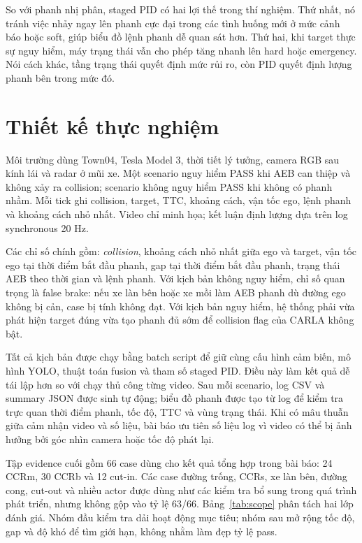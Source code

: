 \documentclass[conference]{IEEEtran}
\begin{document}
So với phanh nhị phân, staged PID có hai lợi thế trong thí nghiệm. Thứ nhất, nó tránh việc nhảy ngay lên phanh cực đại trong các tình huống mới ở mức cảnh báo hoặc soft, giúp biểu đồ lệnh phanh dễ quan sát hơn. Thứ hai, khi target thực sự nguy hiểm, máy trạng thái vẫn cho phép tăng nhanh lên hard hoặc emergency. Nói cách khác, tầng trạng thái quyết định mức rủi ro, còn PID quyết định lượng phanh bên trong mức đó.

\section{Thiết kế thực nghiệm}
Môi trường dùng Town04, Tesla Model 3, thời tiết lý tưởng, camera RGB sau kính lái và radar ở mũi xe. Một scenario nguy hiểm PASS khi AEB can thiệp và không xảy ra collision; scenario không nguy hiểm PASS khi không có phanh nhầm. Mỗi tick ghi collision, target, TTC, khoảng cách, vận tốc ego, lệnh phanh và khoảng cách nhỏ nhất. Video chỉ minh họa; kết luận định lượng dựa trên log synchronous 20 Hz.

Các chỉ số chính gồm: \textit{collision}, khoảng cách nhỏ nhất giữa ego và target, vận tốc ego tại thời điểm bắt đầu phanh, gap tại thời điểm bắt đầu phanh, trạng thái AEB theo thời gian và lệnh phanh. Với kịch bản không nguy hiểm, chỉ số quan trọng là false brake: nếu xe làn bên hoặc xe mồi làm AEB phanh dù đường ego không bị cản, case bị tính không đạt. Với kịch bản nguy hiểm, hệ thống phải vừa phát hiện target đúng vừa tạo phanh đủ sớm để collision flag của CARLA không bật.

Tất cả kịch bản được chạy bằng batch script để giữ cùng cấu hình cảm biến, mô hình YOLO, thuật toán fusion và tham số staged PID. Điều này làm kết quả dễ tái lập hơn so với chạy thủ công từng video. Sau mỗi scenario, log CSV và summary JSON được sinh tự động; biểu đồ phanh được tạo từ log để kiểm tra trực quan thời điểm phanh, tốc độ, TTC và vùng trạng thái. Khi có mâu thuẫn giữa cảm nhận video và số liệu, bài báo ưu tiên số liệu log vì video có thể bị ảnh hưởng bởi góc nhìn camera hoặc tốc độ phát lại.

Tập evidence cuối gồm 66 case dùng cho kết quả tổng hợp trong bài báo: 24 CCRm, 30 CCRb và 12 cut-in. Các case đường trống, CCRs, xe làn bên, đường cong, cut-out và nhiều actor được dùng như các kiểm tra bổ sung trong quá trình phát triển, nhưng không gộp vào tỷ lệ 63/66. Bảng~\ref{tab:scope} phân tách hai lớp đánh giá. Nhóm đầu kiểm tra dải hoạt động mục tiêu; nhóm sau mở rộng tốc độ, gap và độ khó để tìm giới hạn, không nhằm làm đẹp tỷ lệ pass.
\end{document}
